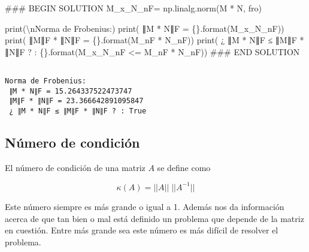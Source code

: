 \documentclass[
  letterpaper,
  DIV=11,
  numbers=noendperiod]{scrreprt}
\newenvironment{Shaded}{\begin{snugshade}}{\end{snugshade}}
\newcommand{\BuiltInTok}[1]{\textcolor[rgb]{0.00,0.23,0.31}{#1}}
\newcommand{\CharTok}[1]{\textcolor[rgb]{0.13,0.47,0.30}{#1}}
\newcommand{\CommentTok}[1]{\textcolor[rgb]{0.37,0.37,0.37}{#1}}
\newcommand{\NormalTok}[1]{\textcolor[rgb]{0.00,0.23,0.31}{#1}}
\newcommand{\OperatorTok}[1]{\textcolor[rgb]{0.37,0.37,0.37}{#1}}
\newcommand{\RegionMarkerTok}[1]{\textcolor[rgb]{0.00,0.23,0.31}{#1}}
\newcommand{\SpecialCharTok}[1]{\textcolor[rgb]{0.37,0.37,0.37}{#1}}
\newcommand{\StringTok}[1]{\textcolor[rgb]{0.13,0.47,0.30}{#1}}
\begin{document}
\begin{Shaded}
\begin{Highlighting}[]
\CommentTok{\#\#\# }\RegionMarkerTok{BEGIN}\CommentTok{ SOLUTION}
\NormalTok{M\_x\_N\_nF}\OperatorTok{=}\NormalTok{ np.linalg.norm(M }\OperatorTok{*}\NormalTok{ N, }\StringTok{\textquotesingle{}fro\textquotesingle{}}\NormalTok{)}

\BuiltInTok{print}\NormalTok{(}\StringTok{\textquotesingle{}}\CharTok{\textbackslash{}n}\StringTok{Norma de Frobenius:\textquotesingle{}}\NormalTok{)}
\BuiltInTok{print}\NormalTok{(}\StringTok{\textquotesingle{} ∥M * N∥F = }\SpecialCharTok{\{\}}\StringTok{\textquotesingle{}}\NormalTok{.}\BuiltInTok{format}\NormalTok{(M\_x\_N\_nF))}
\BuiltInTok{print}\NormalTok{(}\StringTok{\textquotesingle{} ∥M∥F * ∥N∥F = }\SpecialCharTok{\{\}}\StringTok{\textquotesingle{}}\NormalTok{.}\BuiltInTok{format}\NormalTok{(M\_nF }\OperatorTok{*}\NormalTok{ N\_nF))}
\BuiltInTok{print}\NormalTok{(}\StringTok{\textquotesingle{} ¿ ∥M * N∥F ≤ ∥M∥F * ∥N∥F ? : }\SpecialCharTok{\{\}}\StringTok{\textquotesingle{}}\NormalTok{.}\BuiltInTok{format}\NormalTok{(M\_x\_N\_nF }\OperatorTok{\textless{}=}\NormalTok{ M\_nF }\OperatorTok{*}\NormalTok{ N\_nF))}
\CommentTok{\#\#\# }\RegionMarkerTok{END}\CommentTok{ SOLUTION}
\end{Highlighting}
\end{Shaded}

\begin{verbatim}

Norma de Frobenius:
 ∥M * N∥F = 15.264337522473747
 ∥M∥F * ∥N∥F = 23.366642891095847
 ¿ ∥M * N∥F ≤ ∥M∥F * ∥N∥F ? : True
\end{verbatim}

\subsection{Número de condición}\label{nuxfamero-de-condiciuxf3n}

El número de condición de una matriz \(A\) se define como

\[
\kappa(A) = ||A|| \; ||A^{-1}||
\]

Este número siempre es más grande o igual a 1. Además nos da información
acerca de que tan bien o mal está definido un problema que depende de la
matriz en cuestión. Entre más grande sea este número es más difícil de
resolver el problema.
\end{document}
